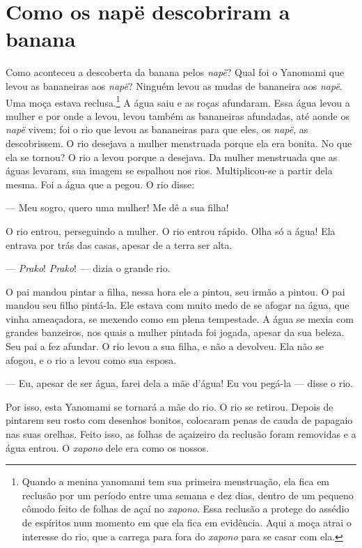 \section{Como os napë descobriram a banana}

Como aconteceu a descoberta da banana pelos \textit{napë}? Qual foi o
Yanomami que levou as bananeiras aos \textit{napë}? Ninguém levou as mudas
de bananeira aos \textit{napë}. Uma moça estava reclusa.\footnote{Quando a menina yanomami tem sua primeira menstruação, ela fica em
reclusão por um período entre uma semana e dez dias, dentro de um
pequeno cômodo feito de folhas de açaí no \textit{xapono}. Essa reclusão a
protege do assédio de espíritos num momento em que ela fica em
evidência. Aqui a moça atrai o interesse do rio, que a carrega para fora
do \textit{xapono} para se casar com ela.} A água saiu
e as roças afundaram. Essa água levou a mulher e por onde a levou, levou
também as bananeiras afundadas, até aonde os \textit{napë} vivem; foi o
rio que levou as bananeiras para que eles, os \textit{napë}, as
descobrissem. O rio desejava a mulher menstruada porque ela era bonita.
No que ela se tornou? O rio a levou porque a desejava. Da mulher
menstruada que as águas levaram, sua imagem se espalhou nos rios.
Multiplicou-se a partir dela mesma. Foi a água que a pegou. O rio
disse: 

--- Meu sogro, quero uma mulher! Me dê a sua filha! 

O rio entrou, perseguindo a mulher. O rio entrou rápido. Olha só a água!
Ela entrava por trás das casas, apesar de a terra ser alta. 

--- \textit{Prako}! \textit{Prako}! --- dizia o grande rio. 

O pai mandou pintar a filha, nessa hora ele a pintou, seu irmão a
pintou. O pai mandou seu filho pintá-la. Ele estava com muito medo de se
afogar na água, que vinha ameaçadora, se mexendo como em plena
tempestade. A água se mexia com grandes banzeiros, nos quais a mulher pintada foi
jogada, apesar da sua beleza. Seu pai a fez afundar. O rio levou a sua filha, e não a devolveu. Ela não se afogou, e o rio a
levou como sua esposa. 

--- Eu, apesar de ser água, farei dela a mãe d'água! Eu vou pegá-la ---
disse o rio. 

Por isso, esta Yanomami se tornará a mãe do rio. O rio se retirou.
Depois de pintarem seu rosto com desenhos bonitos, colocaram penas de
cauda de papagaio nas suas orelhas. Feito isso, as folhas de açaizeiro
da reclusão foram removidas e a água entrou. O \textit{xapono} dele era como os
nossos. 

